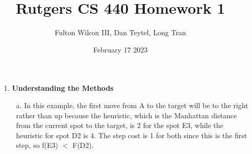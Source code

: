 \documentclass{article}
\title{Rutgers CS 440 Homework 1}
\author{Fulton Wilcox III, Dan Teytel, Long Tran}
\date{February 17 2023}
\begin{document}
\maketitle

    \begin{enumerate}
        \item[1.] \textbf{Understanding the Methods}
        \begin{enumerate}

            \begin{figure}[h!]
		\end{figure}
            
            \item[a.] In this example, the first move from A to the target will be to the right rather than up because the heuristic, which is the Manhattan distance from the current spot to the target, is 2 for the spot E3, while the heuristic for spot D2 is 4.  The step cost is 1 for both since this is the first step, so f(E3) $<$ F(D2).


            

\end{enumerate}
\end{enumerate}
\end{document}
